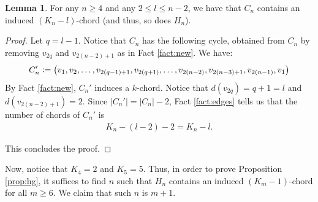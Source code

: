 \documentclass[12pt]{article}
\theoremstyle{definition}
\newtheorem{lemma}[thm]{Lemma}
\newcommand{\defeq}{\vcentcolon=}
\begin{document}
    \begin{lemma} \label{lemma:most}
        For any  $n \geq 4$ and
        any $2 \leq l \leq n-2$,
        we have that $C_{n}$ contains an induced
        $\left(K_{n} - l\right)$-chord
        (and thus, so does $H_{n}$).
    \end{lemma}
    \begin{proof}
        Let $q = l-1$. Notice that
        $C_{n}$ has the following
        cycle, obtained from $C_{n}$
        by removing $v_{2q}$ and
        $v_{2\left(n-2\right)+1}$
        as in Fact \ref{fact:new}.
        We have:
        \begin{gather*}
            C_{n}' \defeq
            \left(v_1, v_2, \ldots,
            v_{2\left(q-1\right)+1},
            v_{2\left(q+1\right)}, \ldots ,
            v_{2\left(n-2\right)},
            v_{2\left(n-3\right) + 1},
            v_{2\left(n-1\right)}, v_1\right)
        \end{gather*}
        By Fact \ref{fact:new}, 
        $C_{n}'$ induces a $k$-chord.
        Notice that
        $d\left(v_{2q}\right) = q+1 = l$
        and $d\left(v_{2\left(n-2\right)+1}\right) = 2$.
        Since $\left|C_{n}'\right| = 
        \left|C_{n}\right| - 2$, 
        Fact \ref{fact:edges} tells
        us that the number of 
        chords of $C_{n}'$ is
        \begin{gather*}
            K_{n} - \left(l-2\right) - 2 = K_{n} - l.
        \end{gather*}
        
        This concludes the proof.
    \end{proof}

    Now, notice that $K_{4} = 2$ and $K_{5} = 5$.
    Thus, in order to prove Proposition \ref{prop:hg},
    it suffices to find $n$ such that $H_{n}$ contains
    an induced $\left(K_{m}-1\right)$-chord for
    all $m \geq 6$. We claim that such $n$ is $m+1$.
\end{document}
